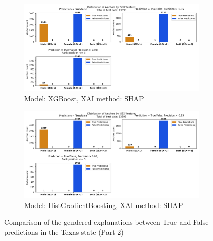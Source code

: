 \begin{figure}[h]
    \ContinuedFloat
    \begin{subfigure}[b]{0.9\textwidth}
        \includegraphics[width=\textwidth]{Images/distribution_folktables/pca_xg_tx_shap.png}
        \caption{Model: XGBoost, XAI method: SHAP}
        \label{fig:distr_xg_tx_shap}
    \end{subfigure}
    \hfill
    \begin{subfigure}[b]{0.9\textwidth}
        \includegraphics[width=\textwidth]{Images/distribution_folktables/pca_skrub_tx_shap.png}
        \caption{Model: HistGradientBoosting, XAI method: SHAP}
        \label{fig:distr_skrub_tx_shap}
    \end{subfigure}
    \caption{Comparison of the gendered explanations between True and False predictions in the Texas state (Part 2)}
    \label{fig:distr_tx}
\end{figure}
